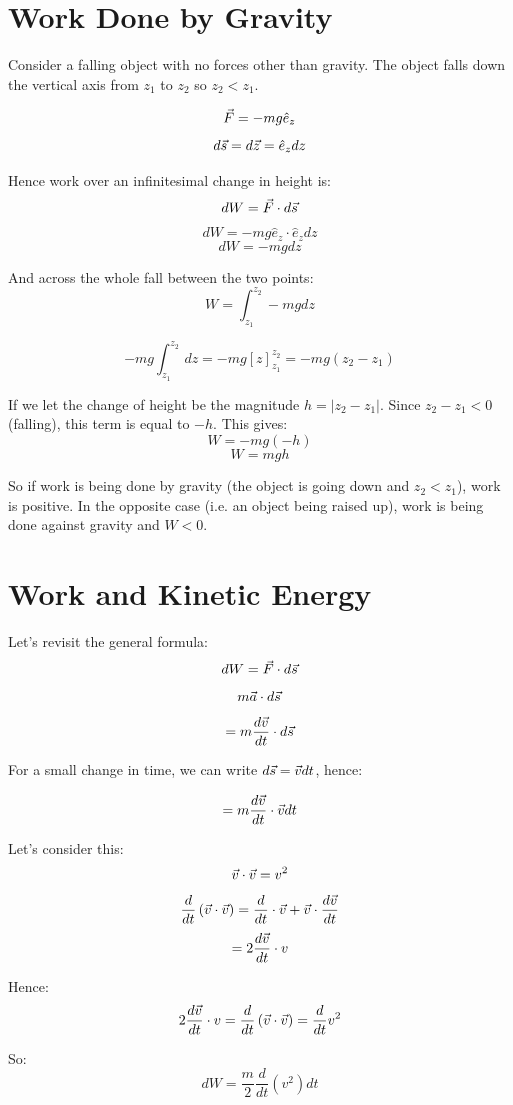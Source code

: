 \section{Work Done by Gravity}
Consider a falling object with no forces other than gravity. The object falls down the vertical axis from $z_1$ to $z_2$ so $z_2 < z_1$.

\[
    \vec{F} = -mg \hat{e}_z
\]
\[
    d\vec{s} = d \vec{z} = \hat{e}_z dz
\]

Hence work over an infinitesimal change in height is:
\[
    dW = \vec{F} \cdot d\vec{s}
\]
\[
    dW = -mg \hat{e}_z \cdot \hat{e}_z dz
\]
\[
    dW = -mg dz
\]

And across the whole fall between the two points:
\[
    W = \int_{z_1}^{z_2} -mg dz
\]

\[
    - mg \int_{z_1}^{z_2}  \, dz = -mg \left[z\right]_{z_1}^{z_2} = -mg (z_2 - z_1)
\]

If we let the change of height be the magnitude $h = |z_2 - z_1|$. Since $z_2 - z_1 < 0$ (falling), this term is equal to $-h$. This gives:
\[
    W = -mg(-h)
\]
\[
    W = mgh
\]

So if work is being done by gravity (the object is going down and $z_2 < z_1$), work is positive. In the opposite case (i.e. an object being raised up), work is being done against gravity and $W < 0$.

\section{Work and Kinetic Energy}
Let's revisit the general formula:
\[
    dW = \vec{F} \cdot d \vec{s}
\]
\[
    m \vec{a} \cdot d \vec{s}
\]
\[
    = m \frac{d \vec{v}}{dt} \cdot d \vec{s}
\]


For a small change in time, we can write $d \vec{s} = \vec{v} dt$, hence:

\[
    = m \frac{d \vec{v}}{dt} \cdot \vec{v} dt
\]

Let's consider this:
\[
    \vec{v} \cdot \vec{v} = v^2
\]
\[
    \frac{d}{dt} \left( \vec{v} \cdot \vec{v} \right) = \frac{d}{dt} \cdot \vec{v} + \vec{v} \cdot \frac{d \vec{v}}{dt}
\]
\[
 = 2 \frac{d \vec{v}}{dt} \cdot v
\]

Hence:
\[
     2\frac{d \vec{v}}{dt} \cdot v = \frac{d}{dt} \left( \vec{v} \cdot \vec{v} \right) = \frac{d}{dt} v^2
\]

So:
\[
    dW = \frac{m}{2} \frac{d}{dt} \left(v^2\right) dt
\]

